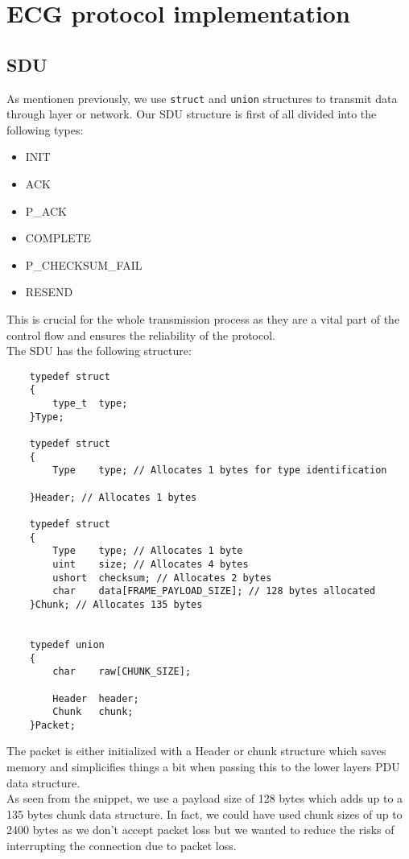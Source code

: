 \documentclass{article}
\newcommand{\code}[1]{\texttt{#1}}
\begin{document}
	\section{ECG protocol implementation}
	
	\subsection{SDU}
	As mentionen previously, we use \code{struct} and \code{union} structures to transmit data through layer or network. Our SDU structure is first of all divided into the following types:
	
	\begin{itemize}
		\item INIT
		\item ACK
		\item P\_ACK
		\item COMPLETE
		\item P\_CHECKSUM\_FAIL
		\item RESEND
	\end{itemize}
	
	This is crucial for the whole transmission process as they are a vital part of the control flow and ensures the reliability of the protocol.\\
	
	The SDU has the following structure:
	
	\begin{lstlisting}
	typedef struct
	{
		type_t  type;
	}Type;
	
	typedef struct
	{
		Type    type; // Allocates 1 bytes for type identification
	
	}Header; // Allocates 1 bytes
	
	typedef struct
	{
		Type    type; // Allocates 1 byte
		uint    size; // Allocates 4 bytes
		ushort  checksum; // Allocates 2 bytes
		char    data[FRAME_PAYLOAD_SIZE]; // 128 bytes allocated
	}Chunk; // Allocates 135 bytes
	
	
	typedef union
	{
		char    raw[CHUNK_SIZE];
	
		Header  header;
		Chunk   chunk;
	}Packet;\end{lstlisting}
	
	The packet is either initialized with a Header or chunk structure which saves memory and simplicifies things a bit when passing this to the lower layers PDU data structure.\\
	
	As seen from the snippet, we use a payload size of 128 bytes which adds up to a 135 bytes chunk data structure. In fact, we could have used chunk sizes of up to 2400 bytes as we don't accept packet loss but we wanted to reduce the risks of interrupting the connection due to packet loss.
\end{document}
